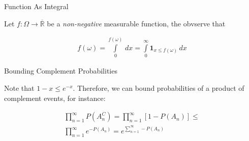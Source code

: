 \documentclass[10pt,landscape]{article}
\renewcommand{\leq}{\leqslant}
\newcommand{\Indicator}[1]{\mathbf{1}_{#1}}
\begin{document}
\begin{multicols}{3}
\begin{observation}{}{Function As Integral}

    Let $f: \Omega \to \overline{\mathbb{R}}$ be a \emph{non-negative} measurable function, the obvserve that

        \begin{align*}
            f(\omega) = \int\limits_0^{f(\omega)} \, dx = \int\limits_0^{\infty} \Indicator{x \leq f(\omega)} \, dx
        \end{align*}

\end{observation}

\begin{observation}{}{Bounding Complement Probabilities}

    Note that $1 - x \leq e^{-x}$. Therefore, we can bound probabilities of a product of complement events, for instance:

        \begin{align*}
            \prod_{n = 1}^{\infty} P(A_n^C) = \prod_{n = 1}^{\infty} [1 - P(A_n)] \leq \\ \prod_{n = 1}^{\infty} e^{-P(A_n)} = e^{\sum_{n = 1}^{\infty} -P(A_n)}
        \end{align*}

\end{observation}

\end{multicols}
\end{document}
